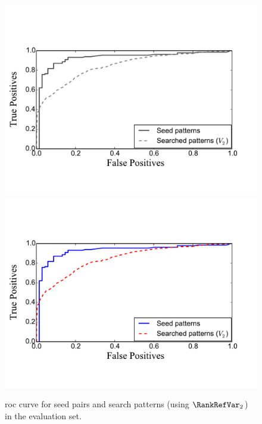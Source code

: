 \begin{figure}
	\begin{center}
		\ifdefined\PRINTVER
			\includegraphics[width=\figSizeSeventy]{ch06_patterns/figures/discovery/seedROC_BW.pdf}
		\else
			\includegraphics[width=\figSizeSeventy]{ch06_patterns/figures/discovery/seedROC.pdf}
		\fi
	\end{center}
	\caption[\acrshort{roc} curve for seed pairs and search patterns]{\acrshort{roc} curve for seed pairs and search patterns (using $\RankRefVar_2$) in the evaluation set.}%
	\label{fig:combinedROCPatternDiscovery}
\end{figure}


